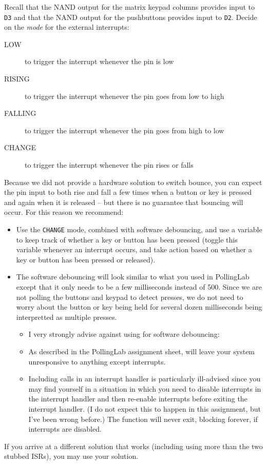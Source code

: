 Recall that the NAND output for the matrix keypad columns provides input to
\texttt{D3} and that the NAND output for the pushbuttons provides input to
\texttt{D2}. Decide on the \textit{mode} for the external interrupts:
    \begin{description}
    \item [LOW] to trigger the interrupt whenever the pin is low
    \item [RISING] to trigger the interrupt whenever the pin goes from low to
        high
    \item [FALLING] to trigger the interrupt whenever the pin goes from high to
        low
    \item [CHANGE] to trigger the interrupt whenever the pin rises or falls
    \end{description}
Because we did not provide a hardware solution to switch bounce, you can expect
the pin input to both rise and fall a few times when a button or key is
pressed and again when it is released -- but there is no guarantee that
bouncing will occur. For this reason we recommend:
    \begin{itemize}
    \item Use the \lstinline{CHANGE} mode, combined with software debouncing,
        and use a variable to keep track of whether a key or button has been
        pressed (toggle this variable whenever an interrupt occurs, and take
        action based on whether a key or button has been pressed or released).
    \item The software debouncing will look similar to what you used in
        PollingLab except that it only needs to be a few milliseconds instead
        of 500. Since we are not polling the buttons and keypad to detect
        presses, we do not need to worry about the button or key being held for
        several dozen milliseconds being interpretted as multiple presses.
        \begin{itemize}
        \item I very strongly advise against using  for
            software debouncing:
        \item As described in the PollingLab assignment sheet,
             will leave your system unresponsive to anything
            except interrupts.
        \item Including  calls in an interrupt handler is
            particularly ill-advised since you may find yourself in a situation
            in which you need to disable interrupts in the interrupt handler
            and then re-enable interrupts before exiting the interrupt handler.
            (I do not expect this to happen in this assignment, but I've been
            wrong before.) The  function will never exit,
            blocking forever, if interrupts are disabled.
        \end{itemize}
    \end{itemize}
If you arrive at a different solution that works (including using more than the
two stubbed ISRs), you may use your solution.

